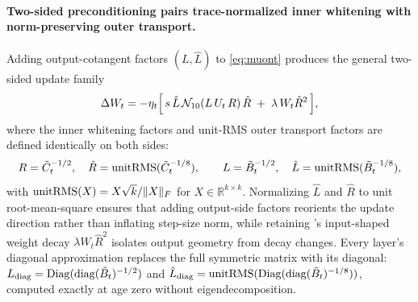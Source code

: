 \paragraph{Two-sided preconditioning pairs trace-normalized inner whitening with norm-preserving outer transport.}
Adding output-cotangent factors $(L, \hat L)$ to \eqref{eq:muont} produces the
general two-sided update family
\begin{equation}
\label{eq:two-sided}
\Delta W_t = -\eta_t \Bigl[\, s\,\hat L\,\mathcal{N}_{10}\!\left(L\,U_t\,R\right)\hat R \;+\; \lambda\,W_t \hat R^2 \,\Bigr],
\end{equation}
where the inner whitening factors and unit-RMS outer transport factors are
defined identically on both sides:
\begin{equation}
\label{eq:factors}
R = \tilde C_t^{-1/2}, \quad \hat R = \operatorname{unitRMS}(\tilde C_t^{-1/8}), \qquad
L = \tilde B_t^{-1/2}, \quad \hat L = \operatorname{unitRMS}(\tilde B_t^{-1/8}),
\end{equation}
with $\operatorname{unitRMS}(X) = X \sqrt{k} / \|X\|_F$ for $X \in \mathbb{R}^{k \times k}$. Normalizing $\hat L$ and
$\hat R$ to unit root-mean-square ensures that adding output-side factors
reorients the update direction rather than inflating step-size norm, while
retaining 's input-shaped weight decay $\lambda W_t \hat R^2$
isolates output geometry from decay changes. Every layer's diagonal
approximation replaces the full symmetric matrix with its diagonal:
$L_{\operatorname{diag}} = \operatorname{Diag}(\operatorname{diag}(\tilde B_t)^{-1/2})$ and
$\hat L_{\operatorname{diag}} = \operatorname{unitRMS}(\operatorname{Diag}(\operatorname{diag}(\tilde B_t)^{-1/8}))$, computed exactly
at age zero without eigendecomposition.

